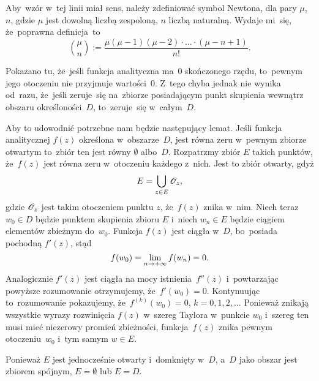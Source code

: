 \documentclass[a4paper,11pt]{article}
\begin{document}
\vspace{\spaceFour}


\start {} Aby~wzór w~tej linii miał sens, należy
zdefiniować symbol Newtona, dla pary $\mu$, $n$, gdzie $\mu$ jest
dowolną liczbą zespoloną, $n$ liczbą naturalną. Wydaje mi~się,
że~poprawna definicja~to
\begin{equation}
  \label{eq:Leja-}
  \binom{ \mu }{ n } := \frac{ \mu ( \mu - 1 ) ( \mu - 2 ) \cdot \ldots
    \cdot ( \mu - n + 1 ) }{ n! }.
\end{equation}

\vspace{\spaceFour}


\start {} Pokazano tu, że~jeśli funkcja analityczna ma~0
skończonego rzędu, to~pewnym jego otoczeniu nie przyjmuje wartości~0.
Z~tego chyba jednak nie wynika od~razu, że~jeśli zeruje~się na~zbiorze
posiadającym punkt skupienia wewnątrz obszaru określoności~$D$,
to~zeruje~się w~całym~$D$.

Aby to udowodnić potrzebne nam będzie następujący lemat. Jeśli funkcja
analitycznej $f( z )$ określona w~obszarze~$D$, jest równa zeru
w~pewnym zbiorze otwartym to~zbiór ten jest równy $\emptyset$
albo~$D$. Rozpatrzmy zbiór $E$ takich punktów, że~$f( z )$ jest równa
zeru w~otoczeniu każdego z~nich. Jest to zbiór otwarty, gdyż
\begin{equation}
  \label{eq:Leja-41}
  E = \bigcup_{ z \in E } \mathcal{O}_{ z },
\end{equation}
gdzie $\mathcal{O}_{ z }$ jest takim otoczeniem punktu $z$, że~$f( z )$ znika
w~nim. Niech teraz $w_{ 0 } \in D$ będzie punktem skupienia zbioru $E$
i~niech $w_{ n } \in E$ będzie ciągiem elementów zbieżnym
do~$w_{ 0 }$. Funkcja $f( z )$ jest ciągła w~$D$, bo~posiada pochodną
$f'( z )$, stąd
\begin{equation}
  \label{eq:Leja-42}
  f( w_{ 0 } ) = \lim\limits_{ n \to +\infty } f( w_{ n } ) = 0.
\end{equation}
Analogicznie $f'( z )$ jest ciągła na mocy istnienia~$f''( z )$
i~powtarzając powyższe rozumowanie otrzymujemy,
że~$f'( w_{ 0 } ) = 0$. Kontynuując to~rozumowanie pokazujemy,
że~$f^{ ( k ) }( w_{ 0 } ) = 0$, $k = 0, 1, 2, \ldots$ Ponieważ
znikają wszystkie wyrazy rozwinięcia $f( z )$ w~szereg Taylora
w~punkcie $w_{ 0 }$ i~szereg ten musi mieć niezerowy promień
zbieżności, funkcja~$f( z )$ znika pewnym otoczeniu~$w_{ 0 }$ i~tym
samym $w \in E$.

Ponieważ $E$ jest jednocześnie otwarty i~domknięty w~$D$, a~$D$ jako
obszar jest zbiorem spójnym, $E = \emptyset$ lub $E = D$.
\end{document}
